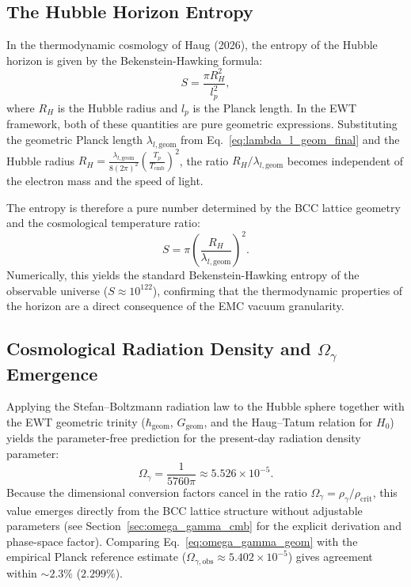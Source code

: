 \documentclass[10pt,a4paper]{article}
\begin{document}
\subsection{The Hubble Horizon Entropy}
\label{sec:hubble_entropy}

In the thermodynamic cosmology of Haug (2026), the entropy of the Hubble horizon is given by the Bekenstein-Hawking formula:
\begin{equation}
	S = \frac{\pi R_H^2}{l_p^2},
\end{equation}
where \(R_H\) is the Hubble radius and \(l_p\) is the Planck length. In the EWT framework, both of these quantities are pure geometric expressions. Substituting the geometric Planck length \(\lambda_{l,\text{geom}}\) from Eq.~\eqref{eq:lambda_l_geom_final} and the Hubble radius \(R_H = \frac{\lambda_{l,\text{geom}}}{8(2\pi)^2} \left( \frac{T_p}{T_{\text{cmb}}} \right)^2\), the ratio \(R_H / \lambda_{l,\text{geom}}\) becomes independent of the electron mass and the speed of light. 

The entropy is therefore a pure number determined by the BCC lattice geometry and the cosmological temperature ratio:
\begin{equation}
	\boxed{
		S = \pi \left( \frac{R_H}{\lambda_{l,\text{geom}}} \right)^2.
	}
	\label{eq:entropy_geom}
\end{equation}
Numerically, this yields the standard Bekenstein-Hawking entropy of the observable universe (\(S \approx 10^{122}\)), confirming that the thermodynamic properties of the horizon are a direct consequence of the EMC vacuum granularity.

\subsection{Cosmological Radiation Density and $\Omega_\gamma$ Emergence}
\label{sec:omega_gamma_emergence}

Applying the Stefan--Boltzmann radiation law to the Hubble sphere together with the EWT geometric trinity ($\hbar_{\text{geom}}$, $G_{\text{geom}}$, and the Haug--Tatum relation for $H_0$) yields the parameter-free prediction for the present-day radiation density parameter:
\begin{equation}
	\Omega_\gamma = \frac{1}{5760\pi} \approx 5.526 \times 10^{-5}.
	\label{eq:omega_gamma_geom}
\end{equation}
Because the dimensional conversion factors cancel in the ratio $\Omega_\gamma = \rho_\gamma / \rho_{\text{crit}}$, this value emerges directly from the BCC lattice structure without adjustable parameters (see Section~\ref{sec:omega_gamma_cmb} for the explicit derivation and phase-space factor). Comparing Eq.~\eqref{eq:omega_gamma_geom} with the empirical Planck reference estimate (\(\Omega_{\gamma,\text{obs}} \approx 5.402 \times 10^{-5}\)) gives agreement within \(\sim 2.3\%\) (\(2.299\%\)).
\end{document}
